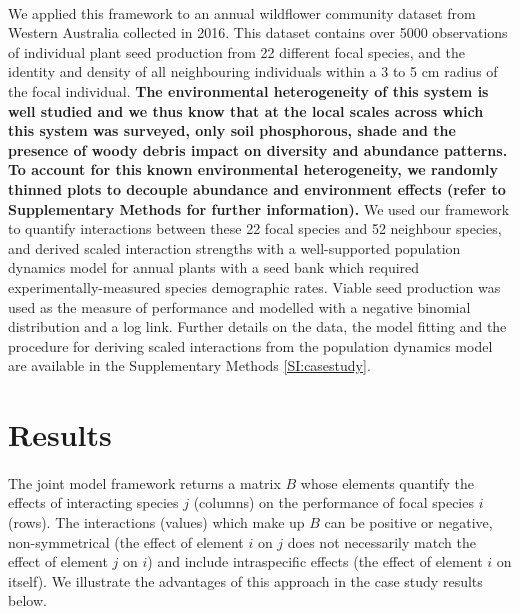 \documentclass[a4,12pt]{article}
\begin{document}
\begin{refsection}
       \paragraph{}
        We applied this framework to an annual wildflower community dataset from Western Australia collected in 2016. This dataset contains over 5000 observations of individual plant seed production from 22 different focal species, and the identity and density of all neighbouring individuals within a 3 to 5 cm radius of the focal individual. \textbf{The environmental heterogeneity of this system is well studied \parencite{Dwyer2015} and we thus know that at the local scales across which this system was surveyed, only soil phosphorous, shade and the presence of woody debris impact on diversity and abundance patterns. To account for this known environmental heterogeneity, we randomly thinned plots to decouple abundance and environment effects (refer to Supplementary Methods for further information).} We used our framework to quantify interactions between these 22 focal species and 52 neighbour species, and derived scaled interaction strengths with a well-supported population dynamics model for annual plants with a seed bank \parencite{Levine2009, Bimler2018} which required experimentally-measured species demographic rates. Viable seed production was used as the measure of performance and modelled with a negative binomial distribution and a log link. Further details on the data, the model fitting and the procedure for deriving scaled interactions from the population dynamics model are available in the Supplementary Methods \ref{SI:casestudy}.


\section{Results}
    
    \paragraph{}
    The joint model framework returns a matrix $B$ whose elements quantify the effects of interacting species $j$ (columns) on the performance of focal species $i$ (rows). The interactions (values) which make up $B$ can be positive or negative, non-symmetrical (the effect of element $i$ on $j$ does not necessarily match the effect of element $j$ on $i$) and include intraspecific effects (the effect of element $i$ on itself). We illustrate the advantages of this approach in the case study results below. 



\end{refsection}
\end{document}
